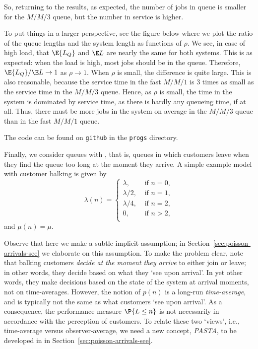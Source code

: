 \begin{exercise}
\begin{solution}
So, returning to the results, as expected, the number of jobs in queue
is smaller for the $M/M/3$ queue, but the number in service is higher.

To put things in a larger perspective, see
the figure below where we plot the ratio of the queue
lengths and the system length as functions of $\rho$. We see, in case
of high load, that $\E{L_Q}$ and $\E L$ are nearly the same for both
systems. This is as expected: when the load is high, most jobs should
be in the queue. Therefore, $\E{L_Q}/\E L \to 1$ as $\rho\to 1$. When
$\rho$ is small, the difference is quite large. This is also
reasonable, because the service time in the fast $M/M/1$ is 3 times as
small as the service time in the $M/M/3$ queue. Hence, as $\rho$ is
small, the time in the system is dominated by service time, as there
is hardly any queueing time, if at all.  Thus, there must be more jobs
in the system on average in the $M/M/3$ queue than in the fast $M/M/1$
queue.

\begin{center}

\end{center}

The  code can be found on \texttt{github} in the \texttt{progs} directory.
\end{solution}
\end{exercise}


Finally, we consider queues with , that is, queues in
which customers leave when they find the queue too long at the moment
they arrive. A simple example model with  customer balking is given by 
  \begin{equation*}
    \lambda(n) = 
  \begin{cases}
    \lambda, &\text{ if } n=0, \\
    \lambda/2, &\text{ if } n=1, \\
    \lambda/4, &\text{ if } n=2, \\
    0, &\text{ if } n > 2, \\
  \end{cases}
  \end{equation*}
and $\mu(n)=\mu$.   

Observe that here we make a subtle implicit
assumption; in Section~\ref{sec:poisson-arrivals-see} we elaborate on
this assumption. To make the problem clear, note that balking
customers \emph{decide at the moment they arrive} to either join or
leave; in other words, they decide based on what they `see upon
arrival'. In yet other words, they make decisions based on the state
of the system at arrival moments, not on time-averages. However, the
notion of $p(n)$ is a long-run \emph{time-average}, and is typically
not the same as what customers `see upon arrival'. As a consequence,
the performance measure $\P{L\leq n}$ is not necessarily in accordance
with the perception of customers. To relate these two `views', i.e.,
time-average versus observer-average, we need a new concept,
\emph{PASTA}, to be developed in in Section~\ref{sec:poisson-arrivals-see}.


